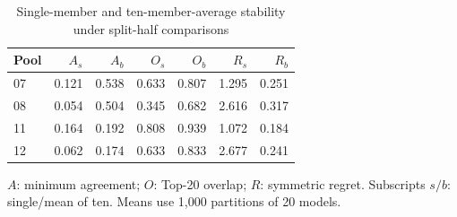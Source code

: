 \par
\begin{table}[H]
\centering
\begin{threeparttable}
\caption{Single-member and ten-member-average stability under split-half comparisons}\label{tab:stability}
\begin{tabular}{@{}lrrrrrr@{}}
\toprule
Pool & $A_s$ & $A_b$ & $O_s$ & $O_b$ & $R_s$ & $R_b$\\
\midrule
07 & 0.121 & 0.538 & 0.633 & 0.807 & 1.295 & 0.251\\
08 & 0.054 & 0.504 & 0.345 & 0.682 & 2.616 & 0.317\\
11 & 0.164 & 0.192 & 0.808 & 0.939 & 1.072 & 0.184\\
12 & 0.062 & 0.174 & 0.633 & 0.833 & 2.677 & 0.241\\
\bottomrule
\end{tabular}
\begin{tablenotes}[flushleft]
\item[] $A$: minimum agreement; $O$: Top-20 overlap; $R$: symmetric regret. Subscripts $s/b$: single/mean of ten. Means use 1,000 partitions of 20 models.
\end{tablenotes}
\end{threeparttable}
\end{table}
\par
